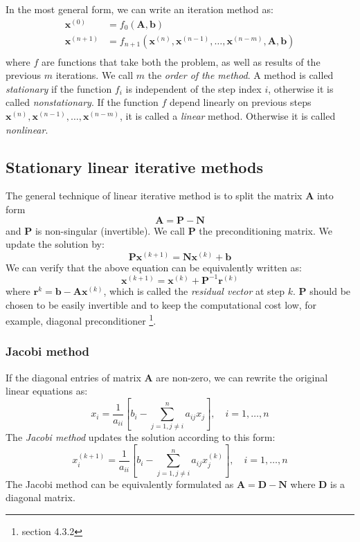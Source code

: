 \documentclass{article}
\begin{document}
In the most general form, we can write an iteration method as:
\begin{align*}
    \mathbf{x}^{(0)} &= f_0(\mathbf{A}, \mathbf{b}) \\
    \mathbf{x}^{(n+1)} &= f_{n+1}(\mathbf{x}^{(n)}, \mathbf{x}^{(n-1)}, \dots,  \mathbf{x}^{(n-m)}, \mathbf{A}, \mathbf{b}) \\
\end{align*}
where $f$ are functions that take both the problem, as well as results of the previous 
$m$ iterations. We call $m$ the \emph{order of the method}. 
A method is called \emph{stationary} if the function $f_i$ is independent of the step index $i$, 
otherwise it is called \emph{nonstationary}. If the function $f$ depend linearly on previous steps 
$\mathbf{x}^{(n)}, \mathbf{x}^{(n-1)}, \dots,  \mathbf{x}^{(n-m)}$, it is called a 
\emph{linear} method. Otherwise it is called \emph{nonlinear}. 

\subsection{Stationary linear iterative methods}
The general technique of linear iterative method is to split the matrix $\mathbf{A}$
into form 
\[\mathbf{A} = \mathbf{P} - \mathbf{N}\]
and $\mathbf{P}$ is non-singular (invertible). We call $\mathbf{P}$ the 
preconditioning matrix. We update the solution by:
\[\mathbf{P}\mathbf{x}^{(k+1)} = \mathbf{N}\mathbf{x}^{(k)} + \mathbf{b}\]
We can verify that the above equation can be equivalently written as:
\[\mathbf{x}^{(k+1)} = \mathbf{x}^{(k)} + \mathbf{P}^{-1}\mathbf{r}^{(k)}\]
where $\mathbf{r}^{k} = \mathbf{b} - \mathbf{A}\mathbf{x}^{(k)}$, which is called 
the \emph{residual vector} at step $k$. $\mathbf{P}$ should be chosen to be easily invertible
and to keep the computational cost low, for example, diagonal preconditioner
\footnote{section 4.3.2}. 

\subsubsection{Jacobi method}
If the diagonal entries of matrix $\mathbf{A}$ are non-zero, we can rewrite the 
original linear equations as:
\begin{equation}
    x_i = \frac{1}{a_{ii}}\left[
        b_i - \sum_{j=1, j\neq i}^n a_{ij}x_j
    \right], \quad i = 1, \dots, n
\end{equation}
The \emph{Jacobi method} updates the solution according to this form:
\begin{equation}
    x_i^{(k+1)} = \frac{1}{a_{ii}}\left[
        b_i - \sum_{j=1, j\neq i}^n a_{ij}x_j^{(k)}
    \right], \quad i = 1, \dots, n
\end{equation}
The Jacobi method can be equivalently formulated as 
$\mathbf{A} = \mathbf{D} - \mathbf{N}$ where $\mathbf{D}$ is a diagonal matrix.
\end{document}
